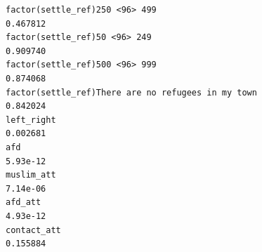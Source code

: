 \documentclass[
]{article}
\begin{document}
\begin{table}
\begin{minipage}[t]{\linewidth}
{\begin{verbatim}
factor(settle_ref)250 <96> 499                                                    0.467812
factor(settle_ref)50 <96> 249                                                     0.909740
factor(settle_ref)500 <96> 999                                                    0.874068
factor(settle_ref)There are no refugees in my town                                0.842024
left_right                                                                        0.002681
afd                                                                               5.93e-12
muslim_att                                                                        7.14e-06
afd_att                                                                           4.93e-12
contact_att                                                                       0.155884
                                                                                     

\end{verbatim}}
\end{minipage}
\end{table}
\end{document}
